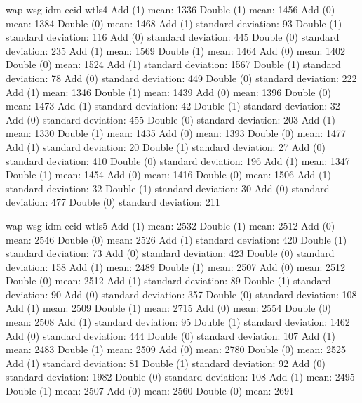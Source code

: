 \documentclass[a4paper, 8pt, envcountsect, runningheads]{article}
\begin{document}
wap-wsg-idm-ecid-wtls4
Add (1) mean: 1336
Double (1) mean: 1456
Add (0) mean: 1384
Double (0) mean: 1468
Add (1) standard deviation: 93
Double (1) standard deviation: 116
Add (0) standard deviation: 445
Double (0) standard deviation: 235
Add (1) mean: 1569
Double (1) mean: 1464
Add (0) mean: 1402
Double (0) mean: 1524
Add (1) standard deviation: 1567
Double (1) standard deviation: 78
Add (0) standard deviation: 449
Double (0) standard deviation: 222
Add (1) mean: 1346
Double (1) mean: 1439
Add (0) mean: 1396
Double (0) mean: 1473
Add (1) standard deviation: 42
Double (1) standard deviation: 32
Add (0) standard deviation: 455
Double (0) standard deviation: 203
Add (1) mean: 1330
Double (1) mean: 1435
Add (0) mean: 1393
Double (0) mean: 1477
Add (1) standard deviation: 20
Double (1) standard deviation: 27
Add (0) standard deviation: 410
Double (0) standard deviation: 196
Add (1) mean: 1347
Double (1) mean: 1454
Add (0) mean: 1416
Double (0) mean: 1506
Add (1) standard deviation: 32
Double (1) standard deviation: 30
Add (0) standard deviation: 477
Double (0) standard deviation: 211

wap-wsg-idm-ecid-wtls5
Add (1) mean: 2532
Double (1) mean: 2512
Add (0) mean: 2546
Double (0) mean: 2526
Add (1) standard deviation: 420
Double (1) standard deviation: 73
Add (0) standard deviation: 423
Double (0) standard deviation: 158
Add (1) mean: 2489
Double (1) mean: 2507
Add (0) mean: 2512
Double (0) mean: 2512
Add (1) standard deviation: 89
Double (1) standard deviation: 90
Add (0) standard deviation: 357
Double (0) standard deviation: 108
Add (1) mean: 2509
Double (1) mean: 2715
Add (0) mean: 2554
Double (0) mean: 2508
Add (1) standard deviation: 95
Double (1) standard deviation: 1462
Add (0) standard deviation: 444
Double (0) standard deviation: 107
Add (1) mean: 2483
Double (1) mean: 2509
Add (0) mean: 2780
Double (0) mean: 2525
Add (1) standard deviation: 81
Double (1) standard deviation: 92
Add (0) standard deviation: 1982
Double (0) standard deviation: 108
Add (1) mean: 2495
Double (1) mean: 2507
Add (0) mean: 2560
Double (0) mean: 2691
\end{document}
